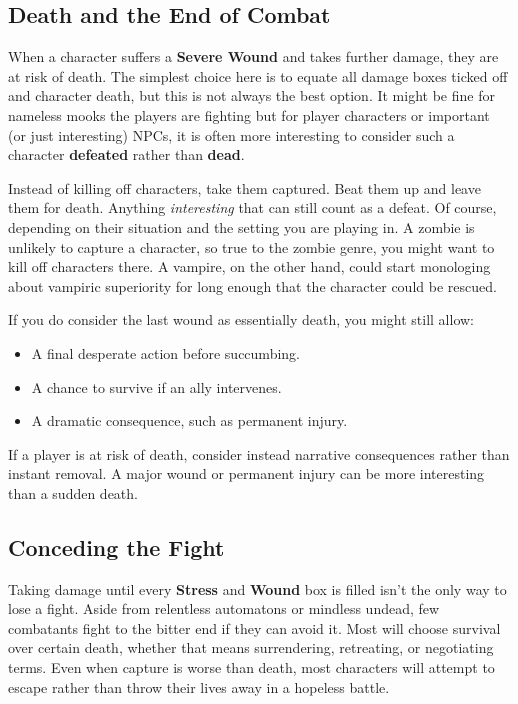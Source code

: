 \begin{multicols}{2}
\subsection{Death and the End of Combat}\label{core:death}
When a character suffers a \textbf{Severe Wound} and takes further damage, they are at risk of death. The simplest choice here is to equate all damage boxes ticked off and character death, but this is not always the best option. It might be fine for nameless mooks the players are fighting but for player characters or important (or just interesting) NPCs, it is often more interesting to consider such a character \textbf{defeated} rather than \textbf{dead}.

Instead of killing off characters, take them captured. Beat them up and leave them for death. Anything \emph{interesting} that can still count as a defeat. Of course, depending on their situation and the setting you are playing in. A zombie is unlikely to capture a character, so true to the zombie genre, you might want to kill off characters there. A vampire, on the other hand, could start monologing about vampiric superiority for long enough that the character could be rescued. 

If you do consider the last wound as essentially death, you might still allow:
\begin{itemize}
    \item A final desperate action before succumbing.
    \item A chance to survive if an ally intervenes.
    \item A dramatic consequence, such as permanent injury.
\end{itemize}

\begin{GmTips}
	If a player is at risk of death, consider instead narrative consequences rather than instant removal. A major wound or permanent injury can be more interesting than a sudden death.
\end{GmTips}


\subsection{Conceding the Fight}\label{core:conceding}

Taking damage until every \textbf{Stress} and \textbf{Wound} box is filled isn’t the only way to lose a fight. Aside from relentless automatons or mindless undead, few combatants fight to the bitter end if they can avoid it. Most will choose survival over certain death, whether that means surrendering, retreating, or negotiating terms. Even when capture is worse than death, most characters will attempt to escape rather than throw their lives away in a hopeless battle.


\end{multicols}
